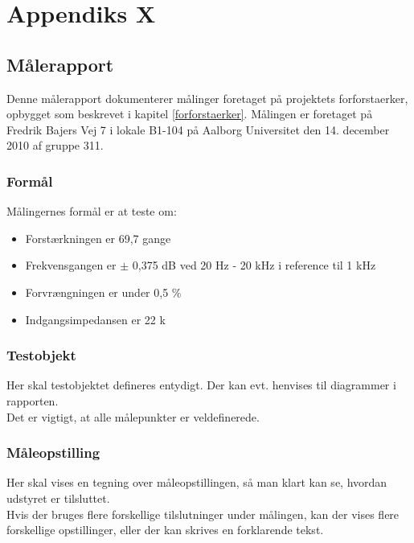 

\chapter{Appendiks X}
\label{maaleforforstaerker}
\section*{Målerapport}
Denne målerapport dokumenterer målinger foretaget på projektets forforstaerker, opbygget som beskrevet i kapitel \ref{forforstaerker}. Målingen er foretaget på Fredrik Bajers Vej 7 i lokale B1-104 på Aalborg Universitet den 14. december 2010 af gruppe 311.

\subsection*{Formål}
\label{maaleforforstaerker_formaal}
Målingernes formål er at teste om:
\begin{itemize}
\item Forstærkningen er 69,7 gange
\item Frekvensgangen er $\pm$ 0,375 dB ved 20 Hz - 20 kHz i reference til 1 kHz
\item Forvrængningen er under 0,5 \%
\item Indgangsimpedansen er 22 k\ohm 
\end{itemize}

\subsection*{Testobjekt}
\label{maaleforforstaerker_testobjekt}
Her skal testobjektet defineres entydigt. Der kan evt. henvises til diagrammer i rapporten.\\
Det er vigtigt, at alle målepunkter er veldefinerede.\\

\subsection*{Måleopstilling}
\label{maaleforforstaerker_maaleopstilling}
Her skal vises en tegning over måleopstillingen, så man klart kan se, hvordan udstyret er tilsluttet.\\
Hvis der bruges flere forskellige tilslutninger under målingen, kan der vises flere forskellige opstillinger, eller der kan skrives en forklarende tekst.\\

